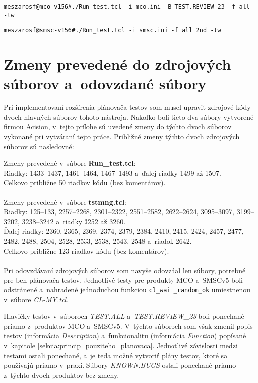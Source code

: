 \begin{lstlisting}[caption=Spúšťanie regresných testov v~produkte MCO
,label=priklad:prilohy_regresie_mco]
meszarosf@mco-v156#./Run_test.tcl -i mco.ini -B TEST.REVIEW_23 -f all -tw
\end{lstlisting}


\begin{lstlisting}[caption=Spúšťanie regresných testov v~produkte SMSCv5
,label=priklad:prilohy_regresie_smsc]
meszarosf@smsc-v156#./Run_test.tcl -i smsc.ini -f all 2nd -tw
\end{lstlisting}



%
%
\chapter{Zmeny prevedené do zdrojových súborov a~odovzdané súbory}
\label{priloha:zmeny_do_zdrojakov}
Pri implementovaní rozšírenia plánovača testov som musel upraviť zdrojové
kódy dvoch hlavných súborov tohoto nástroja. 
Nakoľko boli tieto dva súbory vytvorené firmou Acision, v~tejto prílohe
sú uvedené zmeny do týchto dvoch súborov vykonané pri vytváraní tejto
práce. Približné zmeny týchto dvoch zdrojových súborov sú nasledovné:

\noindent Zmeny prevedené v~súbore \textbf{Run\_test.tcl}: \\
Riadky: 1433--1437, 1461--1464, 1467--1493 a~ďalej riadky 1499 až 1507.\\
Celkovo približne 50 riadkov kódu (bez komentárov).
\\
\\
\noindent Zmeny prevedené v~súbore \textbf{tstmng.tcl}: \\
Riadky: 125--133, 2257--2268, 2301--2322, 2551--2582, 2622--2624, 
3095--3097, 3199--3202, 3238--3242 a~riadky 3252 až 3260. \\
Ďalej riadky: 2360, 2365, 2369, 2374, 2379, 2384, 2410, 2415, 2424, 
2457, 2477, 2482, 2488, 2504, 2528, 2533, 2538, 2543, 2548 a~riadok 2642. \\
Celkovo približne 123 riadkov kódu (bez komentárov).
\\
\\
Pri odovzdávaní zdrojových súborov som navyše odovzdal len súbory,
potrebné pre beh plánovača testov. Jednotlivé testy pre produkty MCO
a~SMSCv5 boli odstránené a~nahradené jednoduchou funkciou 
\texttt{cl\_wait\_random\_ok} umiestnenou v~súbore \textit{CL-MY.tcl}. 

Hlavičky testov v~súboroch \textit{TEST.ALL} a~\textit{TEST.REVIEW\_23} 
boli ponechané priamo z~produktov MCO a~SMSCv5. V~týchto súboroch som 
však zmenil popis testov (informácia \textit{Description}) 
a~funkcionalitu (informácia \textit{Function}) popísané v~kapitole 
\ref{sekcia:princip_pouziteho_planovaca}.
Jednotlivé závislosti medzi testami ostali ponechané, a~je teda možné 
vytvoriť plány testov, ktoré sa používajú priamo v~praxi.
Súbory \textit{KNOWN.BUGS} ostali ponechané priamo z~týchto dvoch 
produktov bez zmeny. 

